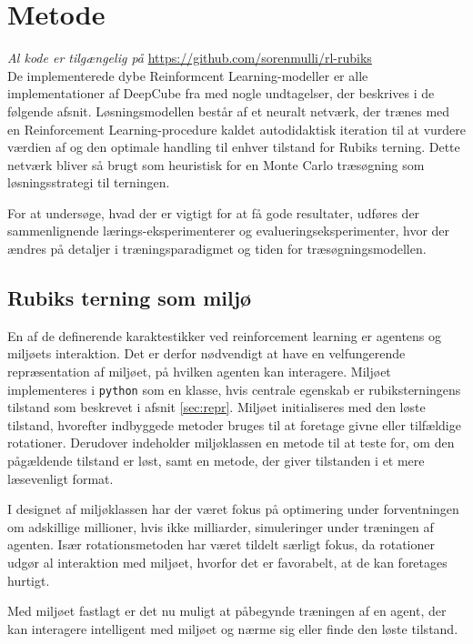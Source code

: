 \documentclass[../main.tex]{subfiles}
\begin{document}
\chapter{Metode}\label{chp:methods}
\textit{Al kode er tilgængelig på} \url{https://github.com/sorenmulli/rl-rubiks}\\
De implementerede dybe Reinformcent Learning-modeller  er alle implementationer af DeepCube fra \cite{HumansBeGone} med nogle undtagelser, der beskrives i de følgende afsnit.
Løsningsmodellen består af et neuralt netværk, der trænes med en Reinforcement Learning-procedure kaldet autodidaktisk iteration til at vurdere værdien af og den optimale handling til enhver tilstand for Rubiks terning.
Dette netværk bliver så brugt som heuristisk for en Monte Carlo træsøgning som løsningsstrategi til terningen.

For at undersøge, hvad der er vigtigt for at få gode resultater, udføres der sammenlignende lærings-eksperimenterer og evalueringseksperimenter, hvor der ændres på detaljer i træningsparadigmet og tiden for træsøgningsmodellen. 

\section{Rubiks terning som miljø}\label{sec:environment}
En af de definerende karaktestikker ved reinforcement learning er agentens og miljøets interaktion.
Det er derfor nødvendigt at have en velfungerende repræsentation af miljøet, på hvilken agenten kan interagere.
Miljøet implementeres i \texttt{python} som en klasse, hvis centrale egenskab er rubiksterningens tilstand som beskrevet i afsnit \ref{sec:repr}.
Miljøet initialiseres med den løste tilstand, hvorefter indbyggede metoder bruges til at foretage givne eller tilfældige rotationer.
Derudover indeholder miljøklassen en metode til at teste for, om den pågældende tilstand er løst, samt en metode, der giver tilstanden i et mere læsevenligt format.

I designet af miljøklassen har der været fokus på optimering under forventningen om adskillige millioner, hvis ikke milliarder, simuleringer under træningen af agenten.
Især rotationsmetoden har været tildelt særligt fokus, da rotationer udgør al interaktion med miljøet, hvorfor det er favorabelt, at de kan foretages hurtigt.

Med miljøet fastlagt er det nu muligt at påbegynde træningen af en agent, der kan interagere intelligent med miljøet og nærme sig eller finde den løste tilstand.
\end{document}
